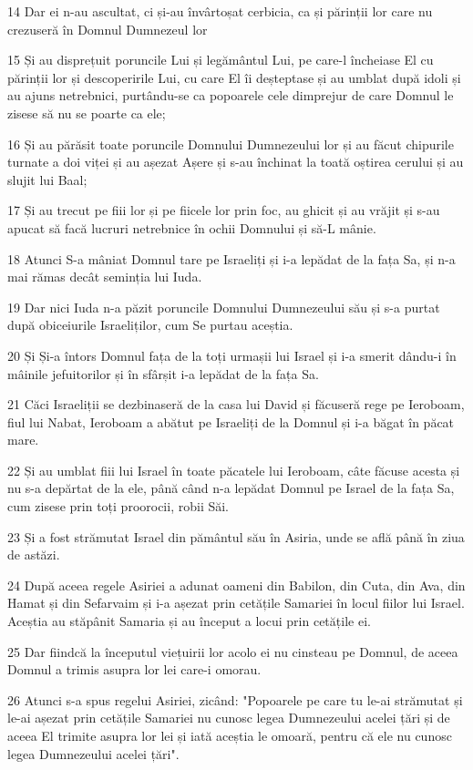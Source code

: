 \par 14 Dar ei n-au ascultat, ci și-au învârtoșat cerbicia, ca și părinții lor care nu crezuseră în Domnul Dumnezeul lor
\par 15 Și au disprețuit poruncile Lui și legământul Lui, pe care-l încheiase El cu părinții lor și descoperirile Lui, cu care El îi deșteptase și au umblat după idoli și au ajuns netrebnici, purtându-se ca popoarele cele dimprejur de care Domnul le zisese să nu se poarte ca ele;
\par 16 Și au părăsit toate poruncile Domnului Dumnezeului lor și au făcut chipurile turnate a doi viței și au așezat Așere și s-au închinat la toată oștirea cerului și au slujit lui Baal;
\par 17 Și au trecut pe fiii lor și pe fiicele lor prin foc, au ghicit și au vrăjit și s-au apucat să facă lucruri netrebnice în ochii Domnului și să-L mânie.
\par 18 Atunci S-a mâniat Domnul tare pe Israeliți și i-a lepădat de la fața Sa, și n-a mai rămas decât seminția lui Iuda.
\par 19 Dar nici Iuda n-a păzit poruncile Domnului Dumnezeului său și s-a purtat după obiceiurile Israeliților, cum Se purtau aceștia.
\par 20 Și Și-a întors Domnul fața de la toți urmașii lui Israel și i-a smerit dându-i în mâinile jefuitorilor și în sfârșit i-a lepădat de la fața Sa.
\par 21 Căci Israeliții se dezbinaseră de la casa lui David și făcuseră rege pe Ieroboam, fiul lui Nabat, Ieroboam a abătut pe Israeliți de la Domnul și i-a băgat în păcat mare.
\par 22 Și au umblat fiii lui Israel în toate păcatele lui Ieroboam, câte făcuse acesta și nu s-a depărtat de la ele, până când n-a lepădat Domnul pe Israel de la fața Sa, cum zisese prin toți proorocii, robii Săi.
\par 23 Și a fost strămutat Israel din pământul său în Asiria, unde se află până în ziua de astăzi.
\par 24 După aceea regele Asiriei a adunat oameni din Babilon, din Cuta, din Ava, din Hamat și din Sefarvaim și i-a așezat prin cetățile Samariei în locul fiilor lui Israel. Aceștia au stăpânit Samaria și au început a locui prin cetățile ei.
\par 25 Dar fiindcă la începutul viețuirii lor acolo ei nu cinsteau pe Domnul, de aceea Domnul a trimis asupra lor lei care-i omorau.
\par 26 Atunci s-a spus regelui Asiriei, zicând: "Popoarele pe care tu le-ai strămutat și le-ai așezat prin cetățile Samariei nu cunosc legea Dumnezeului acelei țări și de aceea El trimite asupra lor lei și iată aceștia le omoară, pentru că ele nu cunosc legea Dumnezeului acelei țări".

